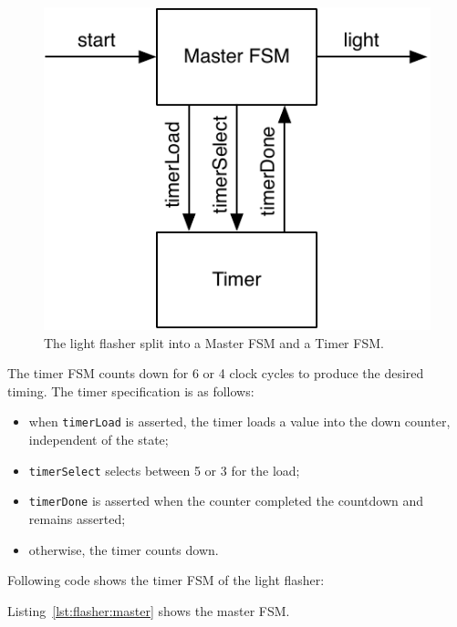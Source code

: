 \documentclass[%
    10pt,
    headinclude, footexclude,
    openright, %
    notitlepage,
    cleardoubleempty,
    headsepline,
    pointlessnumbers,
    bibtotoc, idxtotoc,
    ]{scrbook}
\newcommand{\code}[1]{{\small{\texttt{#1}}}}
\newcommand{\scale}{0.7}
\begin{document}
\begin{figure}
  \centering
  \includegraphics[scale=\scale]{figures/flasher}
  \caption{The light flasher split into a Master FSM and a Timer FSM.}
  \label{fig:flasher}
\end{figure}

The timer FSM counts down for 6 or 4 clock cycles to produce the desired timing.
The timer specification is as follows:

\begin{itemize}
\item when \code{timerLoad} is asserted, the timer loads a value into the down counter,
independent of the state;
\item \code{timerSelect} selects between 5 or 3 for the load;
\item \code{timerDone} is asserted when the counter completed the countdown
and remains asserted;
\item otherwise, the timer counts down.
\end{itemize}

\noindent Following code shows the timer FSM of the light flasher:


\noindent Listing~\ref{lst:flasher:master} shows the master FSM.

\end{document}
